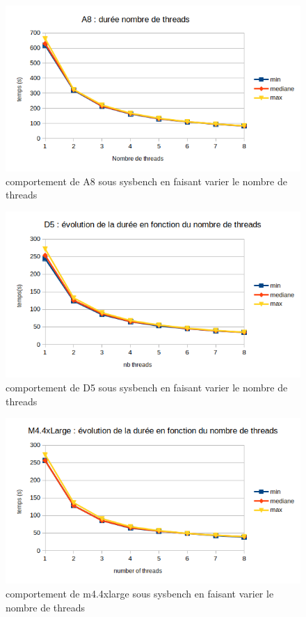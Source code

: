 \documentclass[11pt]{article}
\begin{document}
\begin{figure}
\centering
\includegraphics[width=0.9\linewidth]{images/cpuA8Threads}
\caption{comportement de A8 sous sysbench en faisant varier le nombre de threads}
\label{fig:cpua8threads}
\end{figure}

\begin{figure}
\centering
\includegraphics[width=0.9\linewidth]{images/cpuD5Threads}
\caption{comportement de D5 sous sysbench en faisant varier le nombre de threads}
\label{fig:cpud5threads}
\end{figure}

\begin{figure}
\centering
\includegraphics[width=0.9\linewidth]{images/cpuMLargeThreads}
\caption{comportement de m4.4xlarge sous sysbench en faisant varier le nombre de threads}
\label{fig:cpumlargethreads}
\end{figure}
\end{document}
